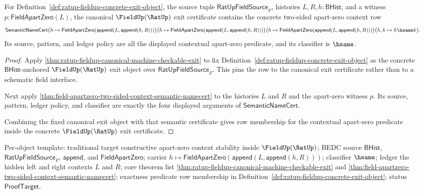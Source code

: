 \begin{theorem}
\label{thm:ratup-fieldup-canonical-apartzero-context-certificate-row}
For Definition~\ref{def:ratup-fieldup-concrete-exit-object}, the source tuple
$\mathsf{RatUpFieldSource}_F$, histories $L,R,h:\mathsf{BHist}$, and a witness
$p:\mathsf{FieldApartZero}(L)$, the canonical $\FieldUp(\RatUp)$ exit
certificate contains the concrete two-sided apart-zero context row
$$
\mathsf{SemanticNameCert}
\bigl(h\mapsto
  \mathsf{FieldApartZero}(\mathsf{append}(L,\mathsf{append}(h,R)))\bigr)
\bigl(h\mapsto
  \mathsf{FieldApartZero}(\mathsf{append}(L,\mathsf{append}(h,R)))\bigr)
\bigl(h\mapsto
  \mathsf{FieldApartZero}(\mathsf{append}(L,\mathsf{append}(h,R)))\bigr)
\bigl(h,k\mapsto h\hsame k\bigr).
$$
Its source, pattern, and ledger policy are all the displayed contextual
apart-zero predicate, and its classifier is $\hsame$.
\end{theorem}
\begin{proof}
Apply \autoref{thm:ratup-fieldup-canonical-machine-checkable-exit} to fix
Definition~\ref{def:ratup-fieldup-concrete-exit-object} as the concrete
$\mathsf{BHist}$-anchored $\FieldUp(\RatUp)$ exit object over
$\mathsf{RatUpFieldSource}_F$. This pins the row to the canonical exit
certificate rather than to a schematic field interface.

Next apply
\autoref{thm:field-apartzero-two-sided-context-semantic-namecert} to the
histories $L$ and $R$ and the apart-zero witness $p$. Its source, pattern,
ledger policy, and classifier are exactly the four displayed arguments of
$\mathsf{SemanticNameCert}$.

Combining the fixed canonical exit object with that semantic certificate gives
row membership for the contextual apart-zero predicate inside the concrete
$\FieldUp(\RatUp)$ exit certificate.
\end{proof}

Per-object template: traditional target constructive apart-zero context
stability inside $\FieldUp(\RatUp)$; BEDC source $\mathsf{BHist}$,
$\mathsf{RatUpFieldSource}_F$, $\mathsf{append}$, and
$\mathsf{FieldApartZero}$; carrier
$h\mapsto\mathsf{FieldApartZero}(\mathsf{append}(L,\mathsf{append}(h,R)))$;
classifier $\hsame$; ledger the hidden left and right contexts $L$ and $R$;
core theorem list \autoref{thm:ratup-fieldup-canonical-machine-checkable-exit}
and \autoref{thm:field-apartzero-two-sided-context-semantic-namecert};
exactness predicate row membership in
Definition~\ref{def:ratup-fieldup-concrete-exit-object}; status
$\mathsf{ProofTarget}$.


